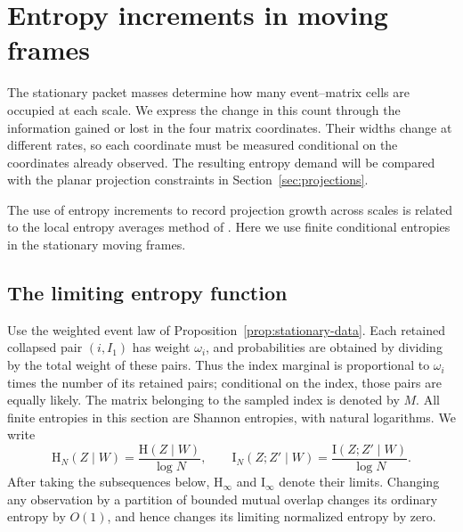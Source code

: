 \section{Entropy increments in moving frames}
\label{sec:entropy}

The stationary packet masses determine how many event--matrix cells are
occupied at each scale.  We express the change in this count through the
information gained or lost in the four matrix coordinates.  Their widths
change at different rates, so each coordinate must be measured conditional
on the coordinates already observed.  The resulting entropy demand will
be compared with the planar projection constraints in
Section~\ref{sec:projections}.

The use of entropy increments to record projection growth across scales
is related to the local entropy averages method of \citet{HS2012}.
Here we use finite conditional entropies in the stationary moving frames.

\subsection{The limiting entropy function}

Use the weighted event law of Proposition~\ref{prop:stationary-data}.
Each retained collapsed pair $(i,I_1)$ has weight $\omega_i$, and
probabilities are obtained by dividing by the total weight of these pairs.
Thus the index marginal is proportional to $\omega_i$ times the number of
its retained pairs; conditional on the index, those pairs are equally
likely.  The matrix belonging to the sampled index is denoted by $M$.
All finite entropies in this section are Shannon entropies, with natural logarithms.
We write
\[
 \mathrm H_N(Z\mid W)=\frac{\mathrm H(Z\mid W)}{\log N},
 \qquad
 \mathrm I_N(Z;Z'\mid W)=\frac{\mathrm I(Z;Z'\mid W)}{\log N}.
\]
After taking the subsequences below, $\mathrm H_\infty$ and
$\mathrm I_\infty$ denote their limits.  Changing any observation by a
partition of bounded mutual overlap changes its ordinary entropy by
$O(1)$, and hence changes its limiting normalized entropy by zero.

